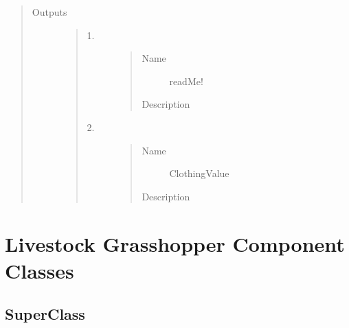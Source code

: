\documentclass[letterpaper,10pt,english]{sphinxmanual}
\begin{document}
\begin{quote}
\begin{description}
\item[{Outputs}] \leavevmode\begin{quote}\begin{description}
\item[{1.}] \leavevmode\begin{quote}\begin{description}
\item[{Name}] \leavevmode
readMe!

\item[{Description}] \leavevmode
{}

\end{description}\end{quote}

\item[{2.}] \leavevmode\begin{quote}\begin{description}
\item[{Name}] \leavevmode
ClothingValue

\item[{Description}] \leavevmode
{}

\end{description}\end{quote}

\end{description}\end{quote}

\end{description}\end{quote}


\chapter{Livestock Grasshopper Component Classes}
\label{\detokenize{component classes::doc}}\label{\detokenize{component classes:livestock-grasshopper-component-classes}}

\section{SuperClass}
\label{\detokenize{component classes:module-livestock.components.component}}\label{\detokenize{component classes:superclass}}
\end{document}

